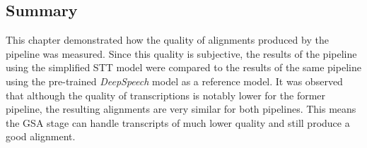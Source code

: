 \subsection{Summary}

This chapter demonstrated how the quality of alignments produced by the pipeline was measured. Since this quality is subjective, the results of the pipeline using the simplified \ac{STT} model were compared to the results of the same pipeline using the pre-trained \textit{DeepSpeech} model as a reference model. It was observed that although the quality of transcriptions is notably lower for the former pipeline, the resulting alignments are very similar for both pipelines. This means the \ac{GSA} stage can handle transcripts of much lower quality and still produce a good alignment.
